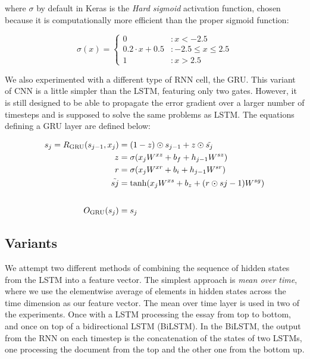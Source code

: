 where $\sigma$ by default in Keras is the \emph{Hard sigmoid} activation
function, chosen because it is computationally more efficient than the proper
sigmoid function:

\begin{equation}
  \sigma(x) = \begin{cases}
    0                 & : x < -2.5 \\
    0.2 \cdot x + 0.5 & : -2.5 \leq x \leq 2.5 \\
    1                 & : x > 2.5
  \end{cases}
\end{equation}

We also experimented with a different type of \ac{RNN} cell, the \ac{GRU}.
This variant of \ac{CNN} is a little simpler than the \ac{LSTM}, featuring
only two gates. However, it is still designed to be able to propagate the
error gradient over a larger number of timesteps and is supposed to solve the
same problems as \ac{LSTM}. The equations defining a \ac{GRU} layer are
defined below:

\begin{equation}
  \begin{aligned}
  s_j = R_{\text{GRU}}(s_{j-1}, x_j) &= (1 - z) \odot s_{j-1} + z \odot \tilde{s_{j}} \\
                            z &= \sigma(x_j W^{xz} + b_f + h_{j-1} W^{sz}) \\
                            r &= \sigma(x_j W^{xr} + b_i + h_{j-1} W^{sr}) \\
                 \tilde{s{j}} &= \tanh(x_j W^{xs} + b_z + (r \odot s{j-1}) W^{sg}) \\
  \\[1\jot]
                 O_{\text{GRU}}(s_j) &= s_j
  \end{aligned}
\end{equation}


\subsection{Variants}

We attempt two different methods of combining the sequence of hidden states
from the \ac{LSTM} into a feature vector. The simplest approach is \emph{mean
over time}, where we use the elementwise average of elements in hidden states
across the time dimension as our feature vector. The mean over time layer is
used in two of the experiments. Once with a \ac{LSTM} processing the essay
from top to bottom, and once on top of a bidirectional LSTM (BiLSTM). In the
BiLSTM, the output from the \ac{RNN} on each timestep is the concatenation of
the states of two \acp{LSTM}, one processing the document from the top and
the other one from the bottom up.

